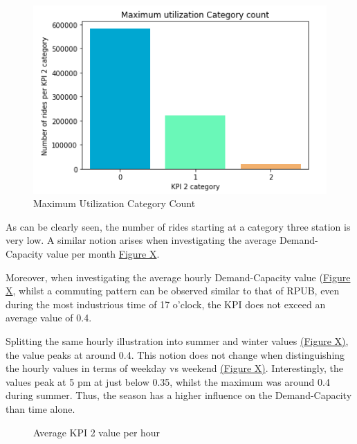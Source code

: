 \begin{figure}[H]
   \centering
    \includegraphics[width=0.6\linewidth]{./Figures/kpi2abb1.png}
    \caption{Maximum Utilization Category Count}
    \label{kpi2abb1}
\end{figure}

As can be clearly seen, the number of rides starting at a category three station is very low. A similar notion arises when investigating the average Demand-Capacity value per month \hyperref[kpi2abb2]{Figure X}.

Moreover, when investigating the average hourly Demand-Capacity value (\hyperref[kpi2abb3]{Figure X}, whilst a commuting pattern can be observed similar to that of RPUB, even during the most industrious time of 17 o'clock, the KPI does not exceed an average value of 0.4. 

Splitting the same hourly illustration into summer and winter values \hyperref[kpi2abb4]{(Figure X)}, the value peaks at around 0.4. This notion does not change when distinguishing the hourly values in terms of weekday vs weekend \hyperref[kpi2abb5]{(Figure X)}. Interestingly, the values peak at 5 pm at just below 0.35, whilst the maximum was around 0.4 during summer. Thus, the season has a higher influence on the Demand-Capacity than time alone.

\begin{figure}[H]
  \centering
  \hfill
  \caption{Average KPI 2 value per hour}
\end{figure}


